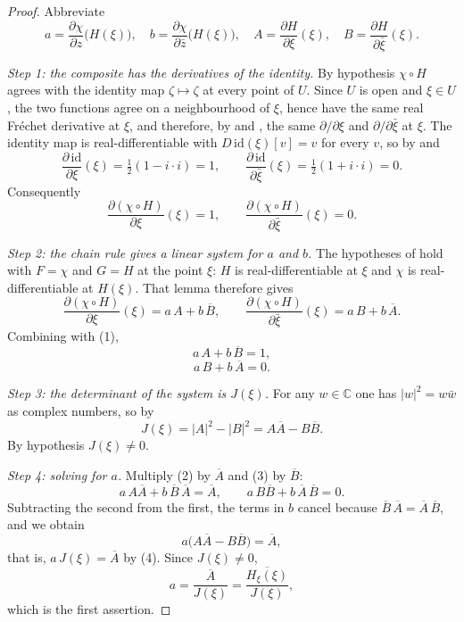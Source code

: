 \begin{proof}
Abbreviate
\[
  a=\frac{\partial\chi}{\partial z}\bigl(H(\xi)\bigr),\quad
  b=\frac{\partial\chi}{\partial\bar z}\bigl(H(\xi)\bigr),\quad
  A=\frac{\partial H}{\partial\xi}(\xi),\quad
  B=\frac{\partial H}{\partial\bar\xi}(\xi).
\]

\emph{Step 1: the composite has the derivatives of the identity.}  By
hypothesis $\chi\circ H$ agrees with the identity map $\zeta\mapsto\zeta$ at
every point of $U$.  Since $U$ is open and $\xi\in U$, the two functions agree
on a neighbourhood of $\xi$, hence have the same real Fr\'echet derivative at
$\xi$, and therefore, by  and , the same
$\partial/\partial\xi$ and $\partial/\partial\bar\xi$ at $\xi$.  The identity
map is real-differentiable with $D\,\mathrm{id}(\xi)[v]=v$ for every $v$, so by
 and 
\[
  \frac{\partial\,\mathrm{id}}{\partial\xi}(\xi)=\tfrac12(1-i\cdot i)=1,
  \qquad
  \frac{\partial\,\mathrm{id}}{\partial\bar\xi}(\xi)=\tfrac12(1+i\cdot i)=0 .
\]
Consequently
\begin{equation}\tag{1}
  \frac{\partial(\chi\circ H)}{\partial\xi}(\xi)=1,
  \qquad
  \frac{\partial(\chi\circ H)}{\partial\bar\xi}(\xi)=0 .
\end{equation}

\emph{Step 2: the chain rule gives a linear system for $a$ and $b$.}  The
hypotheses of  hold with $F=\chi$ and $G=H$ at the
point $\xi$: $H$ is real-differentiable at $\xi$ and $\chi$ is
real-differentiable at $H(\xi)$.  That lemma therefore gives
\[
  \frac{\partial(\chi\circ H)}{\partial\xi}(\xi)=a\,A+b\,\overline{B},
  \qquad
  \frac{\partial(\chi\circ H)}{\partial\bar\xi}(\xi)=a\,B+b\,\overline{A}.
\]
Combining with (1),
\begin{equation}\tag{2}
  a\,A+b\,\overline{B}=1,
\end{equation}
\begin{equation}\tag{3}
  a\,B+b\,\overline{A}=0 .
\end{equation}

\emph{Step 3: the determinant of the system is $J(\xi)$.}  For any
$w\in\mathbb{C}$ one has $|w|^2=w\bar w$ as complex numbers, so by
\begin{equation}\tag{4}
  J(\xi)=|A|^2-|B|^2=A\overline{A}-B\overline{B} .
\end{equation}
By hypothesis $J(\xi)\neq0$.

\emph{Step 4: solving for $a$.}  Multiply (2) by $\overline{A}$ and (3) by
$\overline{B}$:
\[
  a\,A\overline{A}+b\,\overline{B}\,\overline{A}=\overline{A},
  \qquad
  a\,B\overline{B}+b\,\overline{A}\,\overline{B}=0 .
\]
Subtracting the second from the first, the terms in $b$ cancel because
$\overline{B}\,\overline{A}=\overline{A}\,\overline{B}$, and we obtain
\[
  a\bigl(A\overline{A}-B\overline{B}\bigr)=\overline{A},
\]
that is, $a\,J(\xi)=\overline{A}$ by (4).  Since $J(\xi)\neq0$,
\[
  a=\frac{\overline{A}}{J(\xi)}
  =\frac{\overline{H_\xi(\xi)}}{J(\xi)},
\]
which is the first assertion.


\end{proof}
